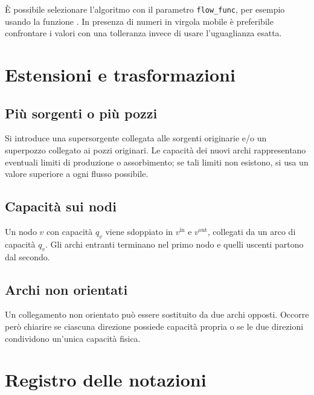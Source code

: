 \documentclass[11pt,a4paper]{article}
\begin{document}
È possibile selezionare l'algoritmo con il parametro \texttt{flow\_func}, per esempio usando la funzione . In presenza di numeri in virgola mobile è preferibile confrontare i valori con una tolleranza invece di usare l'uguaglianza esatta.

\section{Estensioni e trasformazioni}

\subsection{Più sorgenti o più pozzi}
Si introduce una supersorgente collegata alle sorgenti originarie e/o un superpozzo collegato ai pozzi originari. Le capacità dei nuovi archi rappresentano eventuali limiti di produzione o assorbimento; se tali limiti non esistono, si usa un valore superiore a ogni flusso possibile.

\subsection{Capacità sui nodi}
Un nodo $v$ con capacità $q_v$ viene sdoppiato in $v^{\mathrm{in}}$ e $v^{\mathrm{out}}$, collegati da un arco di capacità $q_v$. Gli archi entranti terminano nel primo nodo e quelli uscenti partono dal secondo.

\subsection{Archi non orientati}
Un collegamento non orientato può essere sostituito da due archi opposti. Occorre però chiarire se ciascuna direzione possiede capacità propria o se le due direzioni condividono un'unica capacità fisica.

\section{Registro delle notazioni}
\end{document}
